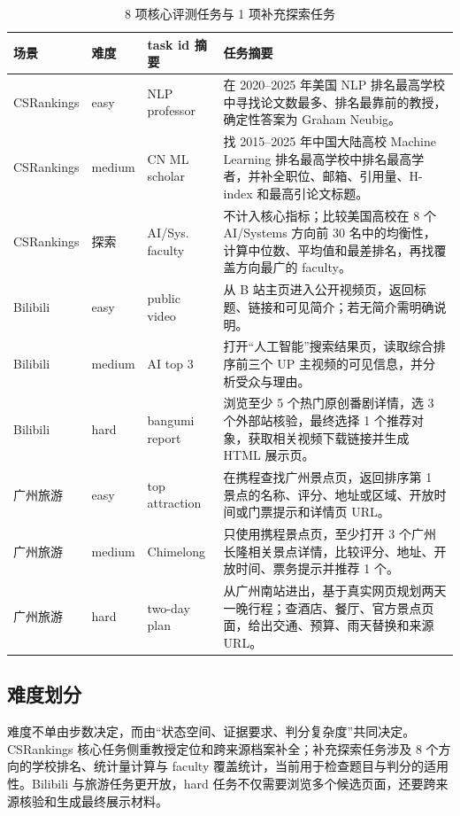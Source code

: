 \begin{table}[H]
  \centering
  \caption{8 项核心评测任务与 1 项补充探索任务}
  \label{tab:task-suite}
  \footnotesize
  \setlength{\tabcolsep}{4pt}
  \begin{tabularx}{\textwidth}{p{}p{}p{}Y}
    \toprule
    场景 & 难度 & task id 摘要 & 任务摘要 \\
    \midrule
    CSRankings & easy & NLP professor & 在 2020--2025 年美国 NLP 排名最高学校中寻找论文数最多、排名最靠前的教授，确定性答案为 Graham Neubig。\\
    CSRankings & medium & CN ML scholar & 找 2015--2025 年中国大陆高校 Machine Learning 排名最高学校中排名最高学者，并补全职位、邮箱、引用量、H-index 和最高引论文标题。\\
    CSRankings & 探索 & AI/Sys. faculty & 不计入核心指标；比较美国高校在 8 个 AI/Systems 方向前 30 名中的均衡性，计算中位数、平均值和最差排名，再找覆盖方向最广的 faculty。\\
    Bilibili & easy & public video & 从 B 站主页进入公开视频页，返回标题、链接和可见简介；若无简介需明确说明。\\
    Bilibili & medium & AI top 3 & 打开“人工智能”搜索结果页，读取综合排序前三个 UP 主视频的可见信息，并分析受众与理由。\\
    Bilibili & hard & bangumi report & 浏览至少 5 个热门原创番剧详情，选 3 个外部站核验，最终选择 1 个推荐对象，获取相关视频下载链接并生成 HTML 展示页。\\
    广州旅游 & easy & top attraction & 在携程查找广州景点页，返回排序第 1 景点的名称、评分、地址或区域、开放时间或门票提示和详情页 URL。\\
    广州旅游 & medium & Chimelong & 只使用携程景点页，至少打开 3 个广州长隆相关景点详情，比较评分、地址、开放时间、票务提示并推荐 1 个。\\
    广州旅游 & hard & two-day plan & 从广州南站进出，基于真实网页规划两天一晚行程；查酒店、餐厅、官方景点页面，给出交通、预算、雨天替换和来源 URL。\\
    \bottomrule
  \end{tabularx}
\end{table}

\subsection{难度划分}

难度不单由步数决定，而由“状态空间、证据要求、判分复杂度”共同决定。CSRankings 核心任务侧重教授定位和跨来源档案补全；补充探索任务涉及 8 个方向的学校排名、统计量计算与 faculty 覆盖统计，当前用于检查题目与判分的适用性。Bilibili 与旅游任务更开放，hard 任务不仅需要浏览多个候选页面，还要跨来源核验和生成最终展示材料。

